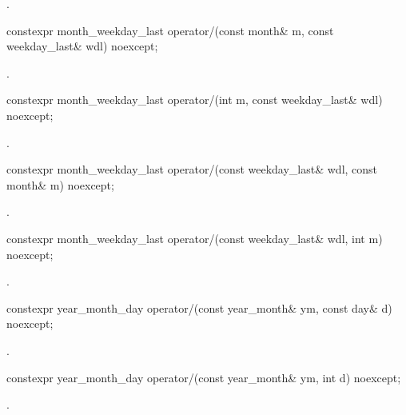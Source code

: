 \begin{itemdescr}
\pnum
\returns {}.
\end{itemdescr}

\begin{itemdecl}
constexpr month_weekday_last
  operator/(const month& m, const weekday_last& wdl) noexcept;
\end{itemdecl}

\begin{itemdescr}
\pnum
\returns {}.
\end{itemdescr}

\begin{itemdecl}
constexpr month_weekday_last
  operator/(int m, const weekday_last& wdl) noexcept;
\end{itemdecl}

\begin{itemdescr}
\pnum
\returns {}.
\end{itemdescr}

\begin{itemdecl}
constexpr month_weekday_last
  operator/(const weekday_last& wdl, const month& m) noexcept;
\end{itemdecl}

\begin{itemdescr}
\pnum
\returns {}.
\end{itemdescr}

\begin{itemdecl}
constexpr month_weekday_last
  operator/(const weekday_last& wdl, int m) noexcept;
\end{itemdecl}

\begin{itemdescr}
\pnum
\returns {}.
\end{itemdescr}

\begin{itemdecl}
constexpr year_month_day
  operator/(const year_month& ym, const day& d) noexcept;
\end{itemdecl}

\begin{itemdescr}
\pnum
\returns {}.
\end{itemdescr}

\begin{itemdecl}
constexpr year_month_day
  operator/(const year_month& ym, int d) noexcept;
\end{itemdecl}

\begin{itemdescr}
\pnum
\returns {}.
\end{itemdescr}

